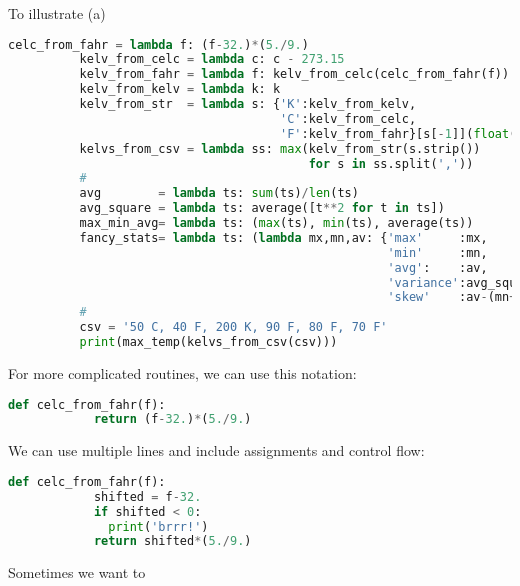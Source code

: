         To illustrate (a)
        \begin{lstlisting}[language=Python, basicstyle=\footnotesize\ttfamily]
          celc_from_fahr = lambda f: (f-32.)*(5./9.)
          kelv_from_celc = lambda c: c - 273.15
          kelv_from_fahr = lambda f: kelv_from_celc(celc_from_fahr(f))
          kelv_from_kelv = lambda k: k
          kelv_from_str  = lambda s: {'K':kelv_from_kelv,
                                      'C':kelv_from_celc,
                                      'F':kelv_from_fahr}[s[-1]](float(s[:-1]))
          kelvs_from_csv = lambda ss: max(kelv_from_str(s.strip())
                                          for s in ss.split(','))
          #
          avg        = lambda ts: sum(ts)/len(ts)
          avg_square = lambda ts: average([t**2 for t in ts])
          max_min_avg= lambda ts: (max(ts), min(ts), average(ts))
          fancy_stats= lambda ts: (lambda mx,mn,av: {'max'     :mx,
                                                     'min'     :mn,
                                                     'avg':    :av,
                                                     'variance':avg_square(ts)-av**2,
                                                     'skew'    :av-(mn+mx)/2})(max_min_avg(ts))
          #
          csv = '50 C, 40 F, 200 K, 90 F, 80 F, 70 F'
          print(max_temp(kelvs_from_csv(csv)))
        \end{lstlisting}

        For more complicated routines, we can use this notation:
        \begin{lstlisting}[language=Python, basicstyle=\footnotesize\ttfamily]
          def celc_from_fahr(f):
            return (f-32.)*(5./9.)
        \end{lstlisting}
        We can use multiple lines and include assignments and control flow:
        \begin{lstlisting}[language=Python, basicstyle=\footnotesize\ttfamily]
          def celc_from_fahr(f):
            shifted = f-32.
            if shifted < 0:
              print('brrr!')
            return shifted*(5./9.)
        \end{lstlisting}

        Sometimes we want to


